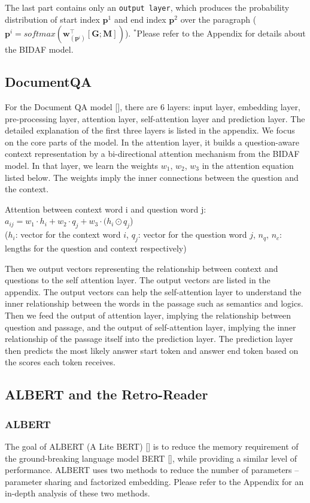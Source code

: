 \documentclass{article}
\begin{document}
    The last part contains only an \verb|output layer|, which produces the probability distribution of start index $\mathbf{p}^1$ and end index $\mathbf{p}^2$ over the paragraph ($\mathbf{p}^i=softmax(\mathbf{w}^\top_{(\mathbf{p}^i)}[\mathbf{G;M}])$). $^\ast$Please refer to the Appendix for details about the BIDAF model.
    
\subsection{DocumentQA}
For the Document QA model [], there are 6 layers: input layer, embedding layer, pre-processing layer, attention layer, self-attention layer and prediction layer. The detailed explanation of the first three layers is listed in the appendix. We focus on the core parts of the model. In the attention layer, it builds a question-aware context representation by a bi-directional attention mechanism from the BIDAF model. In that layer, we learn the weights $w_1$, $w_2$, $w_3$ in the attention equation listed below. The weights imply the inner connections between the question and the context.

Attention between context word i and question word j: 
$a_{ij} = w_1\cdot h_i+w_2\cdot q_j+ w_3\cdot(h_i\odot q_j$)\\
($h_i$: vector for the context word $i$, $q_j$: vector for the question word $j$, $n_q$, $n_c$: lengths for the question and context respectively)

Then we output vectors representing the relationship between context and questions to the self attention layer. The output vectors are listed in the appendix. The output vectors can help the self-attention layer to understand the inner relationship between the words in the passage such as semantics and logics. Then we feed the output of attention layer, implying the relationship between question and passage, and the output of self-attention layer, implying the inner relationship of the passage itself into the prediction layer. The prediction layer then predicts the most likely answer start token and answer end token based on the scores each token receives.\\



\subsection{ALBERT and the Retro-Reader}
\subsubsection{ALBERT}
The goal of ALBERT (A Lite BERT) [] is to reduce the memory requirement of the ground-breaking language model BERT [], while providing a similar level of performance.  ALBERT uses two methods to reduce the number of parameters -- parameter sharing and factorized embedding.  Please refer to the Appendix for an in-depth analysis of these two methods.
\end{document}
